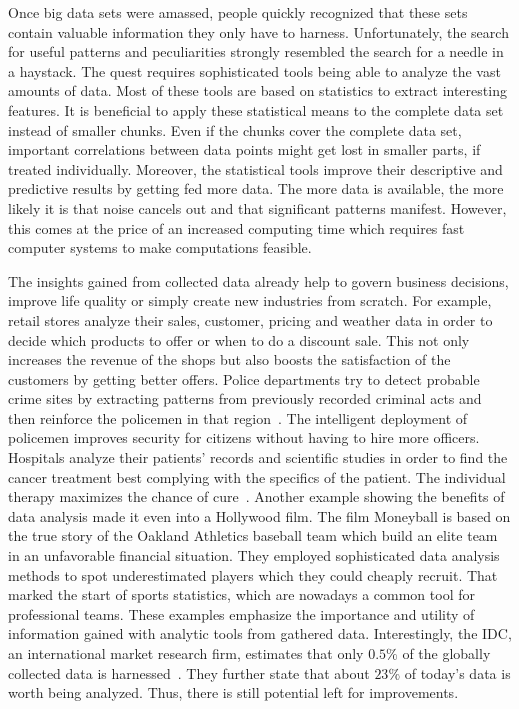 Once big data sets were amassed, people quickly recognized that these sets contain valuable information they only have to harness.
Unfortunately, the search for useful patterns and peculiarities strongly resembled the search for a needle in a haystack.
The quest requires sophisticated tools being able to analyze the vast amounts of data.
Most of these tools are based on statistics to extract interesting features.
It is beneficial to apply these statistical means to the complete data set instead of smaller chunks.
Even if the chunks cover the complete data set, important correlations between data points might get lost in smaller parts, if treated individually.
Moreover, the statistical tools improve their descriptive and predictive results by getting fed more data.
The more data is available, the more likely it is that noise cancels out and that significant patterns manifest.
However, this comes at the price of an increased computing time which requires fast computer systems to make computations feasible.

The insights gained from collected data already help to govern business decisions, improve life quality or simply create new industries from scratch.
For example, retail stores analyze their sales, customer, pricing and weather data in order to decide which products to offer or when to do a discount sale.
This not only increases the revenue of the shops but also boosts the satisfaction of the customers by getting better offers. 
Police departments try to detect probable crime sites by extracting patterns from previously recorded criminal acts and then reinforce the policemen in that region~\cite{lohr:yt2012a}.
The intelligent deployment of policemen improves security for citizens without having to hire more officers.
Hospitals analyze their patients' records and scientific studies in order to find the cancer treatment best complying with the specifics of the patient.
The individual therapy maximizes the chance of cure~\cite{watson:2013a}.
Another example showing the benefits of data analysis made it even into a Hollywood film.
The film Moneyball is based on the true story of the Oakland Athletics baseball team which build an elite team in an unfavorable financial situation.
They employed sophisticated data analysis methods to spot underestimated players which they could cheaply recruit.
That marked the start of sports statistics, which are nowadays a common tool for professional teams.
These examples emphasize the importance and utility of information gained with analytic tools from gathered data.
Interestingly, the IDC, an international market research firm, estimates that only $0.5\%$ of the globally collected data is harnessed~\cite{gantz:iaf2012a}.
They further state that about $23\%$ of today's data is worth being analyzed.
Thus, there is still potential left for improvements.


